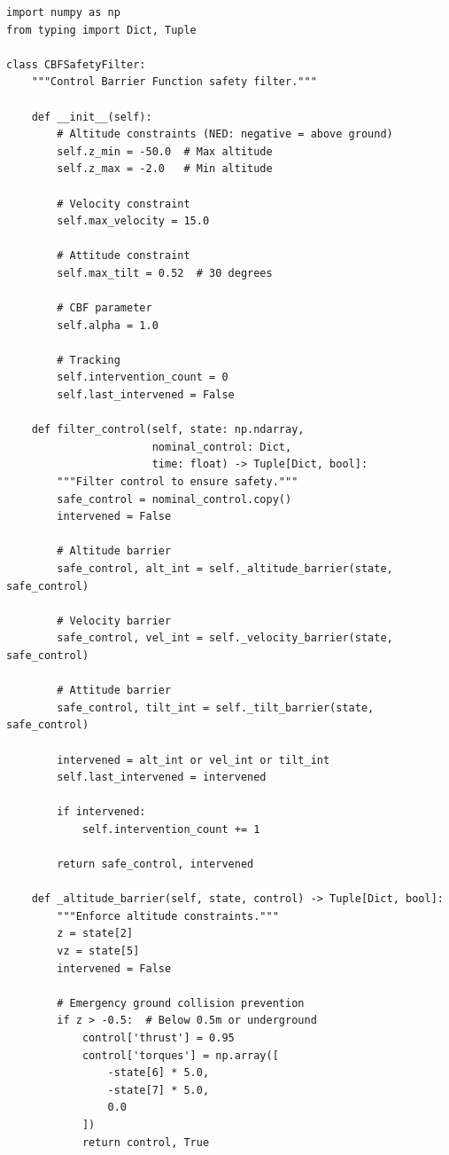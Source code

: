 \begin{lstlisting}[caption={CBF safety filter (cbf\_filter.py)}, label=lst:cbf]
import numpy as np
from typing import Dict, Tuple

class CBFSafetyFilter:
    """Control Barrier Function safety filter."""

    def __init__(self):
        # Altitude constraints (NED: negative = above ground)
        self.z_min = -50.0  # Max altitude
        self.z_max = -2.0   # Min altitude

        # Velocity constraint
        self.max_velocity = 15.0

        # Attitude constraint
        self.max_tilt = 0.52  # 30 degrees

        # CBF parameter
        self.alpha = 1.0

        # Tracking
        self.intervention_count = 0
        self.last_intervened = False

    def filter_control(self, state: np.ndarray,
                       nominal_control: Dict,
                       time: float) -> Tuple[Dict, bool]:
        """Filter control to ensure safety."""
        safe_control = nominal_control.copy()
        intervened = False

        # Altitude barrier
        safe_control, alt_int = self._altitude_barrier(state, safe_control)

        # Velocity barrier
        safe_control, vel_int = self._velocity_barrier(state, safe_control)

        # Attitude barrier
        safe_control, tilt_int = self._tilt_barrier(state, safe_control)

        intervened = alt_int or vel_int or tilt_int
        self.last_intervened = intervened

        if intervened:
            self.intervention_count += 1

        return safe_control, intervened

    def _altitude_barrier(self, state, control) -> Tuple[Dict, bool]:
        """Enforce altitude constraints."""
        z = state[2]
        vz = state[5]
        intervened = False

        # Emergency ground collision prevention
        if z > -0.5:  # Below 0.5m or underground
            control['thrust'] = 0.95
            control['torques'] = np.array([
                -state[6] * 5.0,
                -state[7] * 5.0,
                0.0
            ])
            return control, True


\end{lstlisting}
